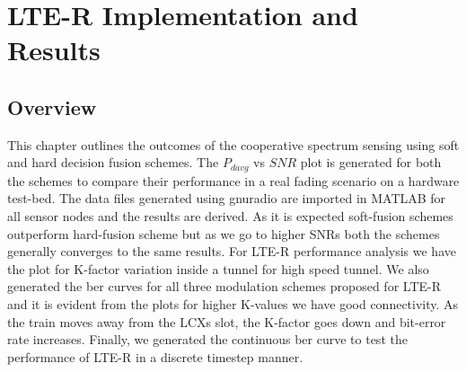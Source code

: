 \chapter{LTE-R Implementation and Results}
\label{chapter6}
\section{Overview} 
This chapter outlines the outcomes of the cooperative spectrum sensing using soft and hard decision fusion schemes. The $P_{davg}$ vs $SNR$ plot is generated for both the schemes to compare their performance in a real fading scenario on a hardware test-bed. The data files generated using gnuradio are imported in MATLAB for all sensor nodes and the results are derived. As it is expected soft-fusion schemes outperform hard-fusion scheme but as we go to higher SNRs both the schemes generally converges to the same results. For LTE-R performance analysis we have the plot for K-factor variation inside a tunnel for high speed tunnel. We also generated the ber curves for all three modulation schemes proposed for LTE-R and it is evident from the plots for higher K-values we have good connectivity. As the train moves away from the LCXs slot, the K-factor goes down and bit-error rate increases. Finally, we generated the continuous ber curve to test the performance of LTE-R in a discrete timestep manner.






